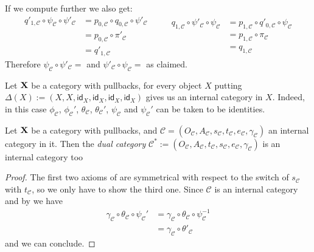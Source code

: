 \documentclass[a4paper,UKenglish,cleveref,pdftex,thm-restate,numberwithinsect]{lipics-v2021}
\newcommand{\id}[1]{\mathsf{id}_{#1}}
\def\X{\textbf {\textup{X}}}
\begin{document}
\begin{remark}
If we compute further we also get:
\[\begin{split}
	q'_{1, \mathcal{C}}\circ \psi_{\mathcal{C}} \circ \psi'_{\mathcal{C}}&= p_{0, \mathcal{C}} \circ q_{0, \mathcal{C}}\circ \psi'_{\mathcal{C}}\\&= p_{0, \mathcal{C}} \circ \pi'_{\mathcal{C}}\\&=q'_{1, \mathcal{C}}
\end{split} \qquad \begin{split}
	q_{1, \mathcal{C}}\circ \psi'_{\mathcal{C}} \circ \psi_{\mathcal{C}}&= p_{1, \mathcal{C}} \circ q'_{0, \mathcal{C}}\circ \psi_{\mathcal{C}}\\&= p_{1, \mathcal{C}} \circ \pi_{\mathcal{C}}\\&=q_{1, \mathcal{C}}
\end{split}\]
Therefore $\psi_{\mathcal{C}}\circ \psi'_{\mathcal{C}}=$ and $\psi'_{\mathcal{C}}\circ \psi_{\mathcal{C}}=$ as claimed.
 \end{remark}

\begin{example}\label{ex:disc}
	Let $\X$ be a category with pullbacks, for every object $X$ putting $\Delta(X):=(X, X, \id{X}, \id{X}, \id{X}, \id{X})$ gives us an internal category in $X$. Indeed, in this case $\phi_{\mathcal{C}}$, $\phi_{\mathcal{C}}'$, $\theta_{\mathcal{C}}$, $\theta_{\mathcal{C}}'$, $\psi_{\mathcal{C}}$ and $\psi_{\mathcal{C}}'$ can be taken to be identities.
\end{example}


\begin{proposition} \label{prop:dual}Let $\X$ be a category with pullbacks, and
 $\mathcal{C}=(O_{\mathcal{C}}, A_{\mathcal{C}}, s_{\mathcal{C}}, t_{\mathcal{C}}, e_{\mathcal{C}}, \gamma_{\mathcal{C}})$ an internal category in it. Then the \emph{dual category} $\mathcal{C}^*:=(O_{\mathcal{C}}, A_{\mathcal{C}}, t_{\mathcal{C}}, s_{\mathcal{C}}, e_{\mathcal{C}}, \gamma_{\mathcal{C}})$ is an internal category too
\end{proposition}
\begin{proof}
The first two axioms of  are symmetrical with respect to the switch of $s_{\mathcal{C}}$ with $t_{\mathcal{C}}$, so we only have to show the third one. Since $\mathcal{C}$ is an internal category and by  we have
\begin{align*}
\gamma_{\mathcal{C}}\circ \theta_{\mathcal{C}} \circ \psi_{\mathcal{C}}' &=\gamma_{\mathcal{C}} \circ \theta_{\mathcal{C}} \circ \psi^{-1}_{\mathcal{C}}\\ & =	\gamma_{\mathcal{C}}\circ \theta'_{\mathcal{C}} 
\end{align*}
and we can conclude.
\end{proof}
\end{document}
